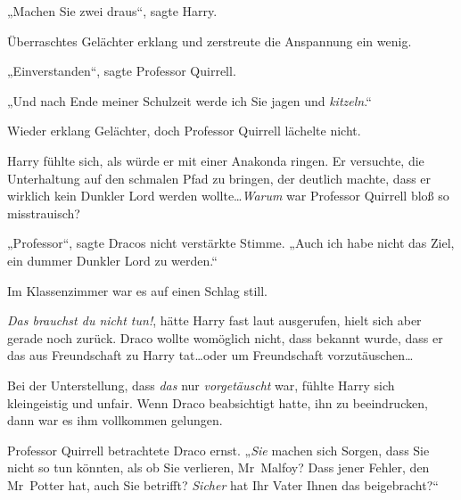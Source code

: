„Machen Sie zwei draus“, sagte Harry.

Überraschtes Gelächter erklang und zerstreute die Anspannung ein wenig.

„Einverstanden“, sagte Professor Quirrell.

„Und nach Ende meiner Schulzeit werde ich Sie jagen und \emph{kitzeln}.“

Wieder erklang Gelächter, doch Professor Quirrell lächelte nicht.

Harry fühlte sich, als würde er mit einer Anakonda ringen. Er versuchte, die Unterhaltung auf den schmalen Pfad zu bringen, der deutlich machte, dass er wirklich kein Dunkler Lord werden wollte…\emph{Warum} war Professor Quirrell bloß so misstrauisch?

„Professor“, sagte Dracos nicht verstärkte Stimme. „Auch ich habe nicht das Ziel, ein dummer Dunkler Lord zu werden.“

Im Klassenzimmer war es auf einen Schlag still.

\emph{Das brauchst du nicht tun!}, hätte Harry fast laut ausgerufen, hielt sich aber gerade noch zurück. Draco wollte womöglich nicht, dass bekannt wurde, dass er das aus Freundschaft zu Harry tat…oder um Freundschaft vorzutäuschen…

Bei der Unterstellung, dass \emph{das} nur \emph{vorgetäuscht} war, fühlte Harry sich kleingeistig und unfair. Wenn Draco beabsichtigt hatte, ihn zu beeindrucken, dann war es ihm vollkommen gelungen.

Professor Quirrell betrachtete Draco ernst. „\emph{Sie} machen sich Sorgen, dass Sie nicht so tun könnten, als ob Sie verlieren, Mr~Malfoy? Dass jener Fehler, den Mr~Potter hat, auch Sie betrifft? \emph{Sicher} hat Ihr Vater Ihnen das beigebracht?“

